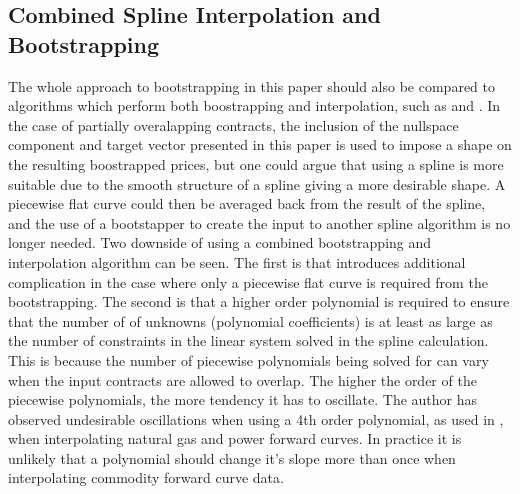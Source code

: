 \documentclass{article}
\begin{document}
\subsection{Combined Spline Interpolation and Bootstrapping}
The whole approach to bootstrapping in this paper should also be compared to algorithms
which perform both boostrapping and interpolation, such as \cite{Fowler} and \cite{Benth}. In the case of
partially overalapping contracts, the inclusion of the nullspace component and target
vector presented in this paper is used to impose a shape on the resulting boostrapped
prices, but one could argue that using a spline is more suitable due to the smooth 
structure of a spline giving a more desirable shape. A piecewise flat curve could
then be averaged back from the result of the spline, and the use of a bootstapper
to create the input to another spline algorithm is no longer needed. Two downside of
using a combined bootstrapping and interpolation algorithm can be seen. The first
is that introduces additional complication in the case where only a piecewise flat
curve is required from the bootstrapping. The second is that a higher order polynomial
is required to ensure that the number of of unknowns (polynomial coefficients) is at
least as large as the number of constraints in the linear system solved in the spline
calculation. This is because the number of piecewise polynomials being solved for can 
vary when the input contracts are allowed to overlap. The higher the order of the
piecewise polynomials, the more tendency it has to oscillate.
The author has observed undesirable oscillations when using a 4th order polynomial,
as used in \cite{Benth}, when interpolating natural gas and power forward curves. 
In practice it is unlikely that a polynomial should change it's
slope more than once when interpolating commodity forward curve data.


\bigskip
\end{document}
